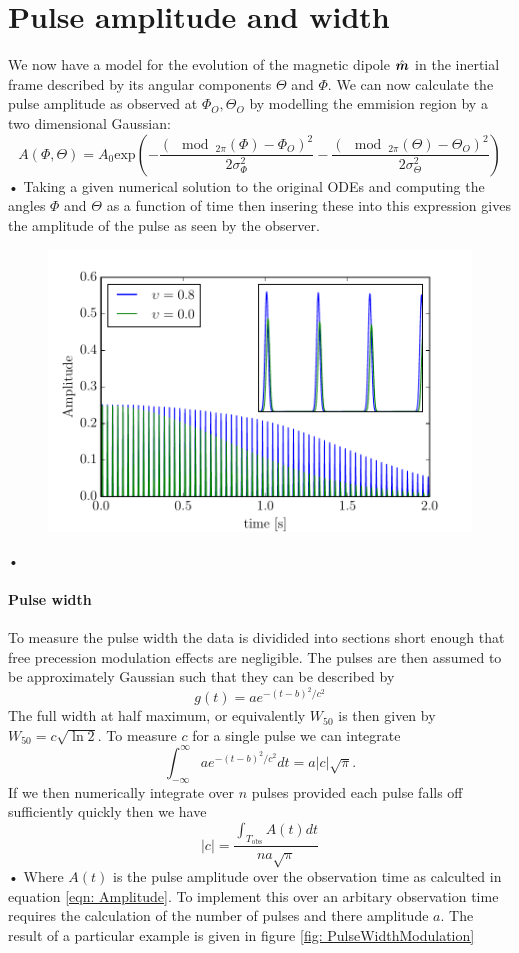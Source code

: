 \documentclass[11pt]{article}
\numberwithin{equation}{section}
\numberwithin{figure}{section}
\numberwithin{table}{section}
\begin{document}
\section{Pulse amplitude and width}
We now have a model for the evolution of the magnetic dipole $\hat{\boldsymbol{m}}$ in the inertial frame described by its angular components $\Theta$ and $\Phi$. We can now calculate the pulse amplitude as observed at $\Phi_{O}, \Theta_{O}$ by modelling the emmision region by a two dimensional Gaussian:
\begin{equation}
A(\Phi, \Theta)  = A_{0} \textrm{exp}\left(-\frac{\left(\mod_{2\pi}(\Phi)-\Phi_{O}\right)^{2}}{2\sigma_{\Phi}^{2}}-\frac{\left(\mod_{2\pi}(\Theta)-\Theta_{O}\right)^{2}}{2\sigma_{\Theta}^{2}}\right)
\label{eqn: Amplitude}
\end{equation}•
Taking a given numerical solution to the original ODEs and computing the angles $\Phi$ and $\Theta$ as a function of time then insering these into this expression gives the amplitude of the pulse as seen by the observer. 
\begin{figure}[ht]
\centering
\includegraphics[width=.5\textwidth]{AmplitudeModulation}
\caption{}
\label{fig: AmplitudeModulation}
\end{figure}•

\paragraph{Pulse width}
To measure the pulse width the data is dividided into sections short enough that free precession 
modulation effects are negligible. The pulses are then assumed to be approximately Gaussian such
that they can be described by
\begin{equation}
g(t) = a e^{-(t-b)^{2}/c^{2}}
\end{equation}
The full width at half maximum, or equivalently $W_{50}$ is then given by $W_{50}=c\sqrt{\ln{2}}$. 
To measure $c$ for a single pulse we can integrate
\begin{equation}
\int_{-\infty}^{\infty}a e^{-(t-b)^{2}/c^{2}} dt = a |c| \sqrt{\pi}.
\end{equation}
If we then numerically integrate over $n$ pulses provided each pulse falls off sufficiently quickly 
then we have
\begin{equation}
|c| = \frac{\int_{T_{\textrm{obs}}} A(t) dt}{n a \sqrt{\pi}}
\end{equation}•
Where $A(t)$ is the pulse amplitude over the observation time as calculted in equation 
\eqref{eqn: Amplitude}. To implement this over an arbitary observation time requires the 
calculation of the number of pulses and there amplitude $a$. The result of a particular 
example is given in figure \ref{fig: PulseWidthModulation} 
\end{document}
